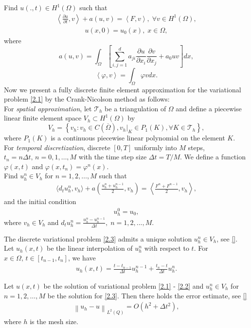 \documentclass[twocolumn]{article}
\begin{document}
Find $u(.,t)\in H^1(\Omega)$ such that
\begin{align}\label{2.1}
	\left\langle \frac{\partial u}{\partial t}, v \right\rangle+a\left(u, v\right)=\left\langle F, v \right\rangle,\; \forall v\in H^1(\Omega),
\end{align} 
\begin{align}\label{2.2}
	u(x, 0)=u_0(x), \; x\in \Omega,
\end{align}
where 
$$a\left(u, v\right)=\int_{\Omega}\left[\sum_{i, j=1}^{d}a_{ji}\frac{\partial u}{\partial x_i}\frac{\partial v}{\partial x_j}+a_0uv\right]dx,$$
$$\left\langle \varphi, v \right\rangle=\int_{\Omega}\varphi vdx.$$
Now we present a fully discrete finite element approximation for the variational problem \eqref{2.1} by the Crank-Nicolson method as follows:
\\
For \textit{spatial approximation}, let $\mathcal{T}_h$ be a triangulation of $\Omega$ and define a piecewise linear finite element space $V_h \subset H^1(\Omega)$ by
$$V_h=\left\{v_h:v_h\in C(\overline{\Omega}), v_h|_K\in P_1(K), \forall K\in \mathcal{T}_h\right\},$$
where $P_1(K)$ is a continuous piecewise linear polynomial on the element $K$. 
\\
For \textit{temporal discretization}, discrete $[0, T]$ uniformly into $M$ steps, $t_n=n\Delta t,\, n=0, 1, \dots, M$ with the time step size $\Delta t = T/M$. We define a function $\varphi(x, t)$ and $\varphi(x, t_n)=\varphi^n(x)$.
\\
Find $u^n_h\in V_h$ for $n=1, 2, \dots, M$ such that
\begin{align}\label{2.3}
	\langle d_tu^n_h, v_h \rangle+a\left(\frac{u^n_h+u^{n-1}_h}{2}, v_h\right)=\left\langle \frac{F^n+F^{n-1}}{2}, v_h \right\rangle,
\end{align}
and the initial condition 
\begin{align}\label{2.4}
	u^0_h=u_0,
\end{align}
where $v_h\in V_h$ and $d_tu^n_h=\frac{u^n_h-u^{n-1}_h}{\Delta t}, \; n=1, 2, ..., M.$

The discrete variational problem \eqref{2.3} admits a unique solution $u^n_h\in V_h$, see \eqref{}. Let $u_h(x, t)$ be the linear interpolation of $u_h^n$ with respect to $t$. 
For $x\in \Omega,\, t\in [t_{n-1}, t_n]$, we have
\begin{align*}
	u_h(x, t)=\frac{t-t_{n-1}}{\Delta t}u_h^{n-1}+\frac{t_n-t}{\Delta t}u_h^{n}.
\end{align*}
\begin{dl}\label{dl2.1}
	Let $u(x, t)$ be the solution of variational problem \eqref{2.1} - \eqref{2.2} and $u^n_h\in V_h$ for $n=1, 2, \dots, M$ be the solution for \eqref{2.3}. Then there holds the error estimate, see \eqref{}
	\begin{align}\label{2.5}
		\left\|u_h-u\right\|_{L^2(Q)}=O\left(h^2+\Delta t^2\right),
	\end{align}
	where $h$ is the mesh size.
\end{dl}
\end{document}
